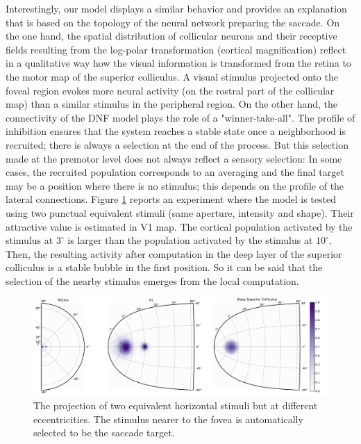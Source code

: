 Interestingly, our model displays a similar behavior and provides an
explanation that is based on the topology of the neural network
preparing the saccade. On the one hand, the spatial distribution of
collicular neurons and their receptive fields resulting from the
log-polar transformation (cortical magnification) reflect in a
qualitative way how the visual information is transformed from the
retina to the motor map of the superior colliculus. A visual stimulus
projected onto the foveal region evokes more neural activity (on the
rostral part of the collicular map) than a similar stimulus in the
peripheral region.  On the other hand, the connectivity of the DNF
model plays the role of a "winner-take-all". The profile of inhibition
ensures that the system reaches a stable state once a neighborhood is
recruited; there is always a selection at the end of the process. But
this selection made at the premotor level does not always reflect a
sensory selection: In some cases, the recruited population corresponds
to an averaging and the final target may be a position where there is
no stimulus; this depends on the profile of the lateral connections.
Figure \ref{fig:selection} reports an experiment where the model is
tested using two punctual equivalent stimuli (same aperture, intensity
and shape).  Their attractive value is estimated in V1 map.  The
cortical population activated by the stimulus at $3^\circ$ is larger
than the population activated by the stimulus at $10^\circ$. Then, the
resulting activity after computation in the deep layer of the superior
colliculus is a stable bubble in the first position. So it can be said
that the selection of the nearby stimulus emerges from the local
computation.

\begin{figure}
  \centering
    \includegraphics[width=\textwidth]{Chapitres/PublicationsSample/Chapitre/figures/selection}
  \caption{The projection of two equivalent horizontal stimuli but at different eccentricities. The stimulus nearer to the fovea is automatically selected to be the saccade target. }
  \label{fig:selection}
\end{figure}

